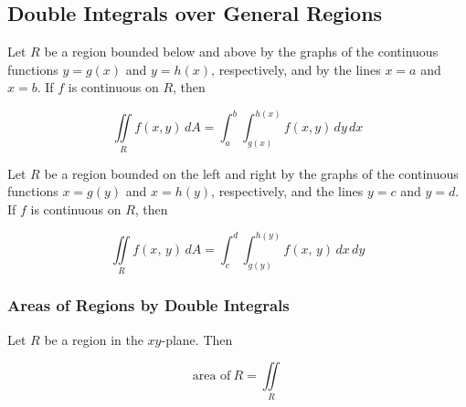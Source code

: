 \subsection{Double Integrals over General Regions}
Let $R$ be a region bounded below and above by the graphs of the continuous functions $y = g(x)$ and $y = h(x)$, respectively, and by the lines $x = a$ and $x = b$. If $f$ is continuous on $R$, then

\begin{equation}
    \iint \limits _R f(x, y) \,dA = \int _a ^b \int _{g(x)} ^{h(x)} f(x, y)\, dy\, dx
\end{equation}

Let $R$ be a region bounded on the left and right by the graphs of the continuous functions $x = g(y)$  and $x = h(y)$, respectively, and the lines $y = c$ and $y = d$. If $f$ is continuous on $R$, then

\begin{equation}
    \iint \limits _R f(x,\, y) \,dA = \int _c ^d \int _{g(y)} ^{h(y)} f(x,\, y)\, dx\, dy
\end{equation}

\subsubsection{Areas of Regions by Double Integrals}
Let $R$ be a region in the $xy$-plane. Then

\begin{equation}
    \text{area of}\ R = \iint \limits _R
\end{equation}
